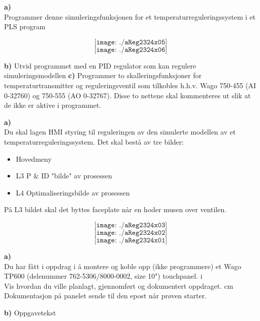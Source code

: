 \vfil \eject
\oppgave{}%
\textbf{a)}\\
Programmer denne simuleringsfunksjonen for et temperaturreguleringssystem i et PLS program
\vskip 1cm 

$$\texttt{[image: ./aReg2324x05]}$$
$$\texttt{[image: ./aReg2324x06]}$$

\textbf{b)}
Utvid programmet med en PID regulator som kan regulere simuleringsmodellen
\vskip 1cm 
\textbf{c)}
Programmer to skalleringsfunksjoner for temperaturtransmitter og reguleringsventil som tilkobles h.h.v. Wago 750-455 (AI 0-32760) og 750-555 (AO 0-32767). Disse to nettene skal kommenteres ut slik at de ikke er aktive i programmet. 
\vskip 1cm 

\vfil \eject
\oppgave{}%
\textbf{a)}\\
\vskip 1cm 
Du skal lagen HMI styring til reguleringen av den simulerte modellen av et temperaturreguleringssystem. Det skal bestå av tre bilder:
\begin{itemize}
	\item Hovedmeny
	\item L3 P \& ID "bilde" av prosessen
	\item L4 Optimaliseringsbilde av prosessen
\end{itemize}

På L3 bildet skal det byttes faceplate når en hoder musen over ventilen. 


$$\texttt{[image: ./aReg2324x03]}$$
$$\texttt{[image: ./aReg2324x02]}$$
$$\texttt{[image: ./aReg2324x01]}$$

\vfil \eject
\oppgave{}%
\textbf{a)}\\
Du har fått i oppdrag i å montere og koble opp (ikke programmere) et Wago TP600 (delenummer 762-5306/8000-0002, size 10") touchpanel. i\\
Vis hvordan du ville planlagt, gjennomført og dokumentert oppdraget.
 cm 
Dokumentasjon på panelet sende til den epost når prøven starter. 
\vskip 1cm 


\textbf{b)}
Oppgavetekst
\vskip 1cm 

\vfil \eject


